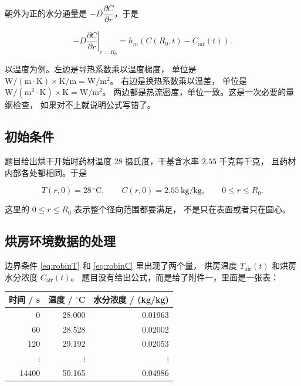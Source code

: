 朝外为正的水分通量是 $-D\dfrac{\partial C}{\partial r}$，于是

\begin{equation}
-D\left.\frac{\partial C}{\partial r}\right|_{r=R_0}
= h_m\left(C(R_0,t)-C_{\mathrm{air}}(t)\right).
\label{eq:robinC}
\end{equation}

以温度为例。左边是导热系数乘以温度梯度，
单位是 $\mathrm{W/(m\cdot K)}\times\mathrm{K/m}=\mathrm{W/m^2}$。
右边是换热系数乘以温差，
单位是 $\mathrm{W/(m^2\cdot K)}\times\mathrm{K}=\mathrm{W/m^2}$。
两边都是热流密度，单位一致。这是一次必要的量纲检查，
如果对不上就说明公式写错了。

\subsection{初始条件}

题目给出烘干开始时药材温度 $28$ 摄氏度，干基含水率 $2.55$ 千克每千克，
且药材内部各处都相同。于是

\begin{equation}
T(r,0)=28\,^\circ\mathrm{C},\qquad C(r,0)=2.55\ \mathrm{kg/kg},
\qquad 0\le r\le R_0 .
\label{eq:ic}
\end{equation}

这里的 $0\le r\le R_0$ 表示整个径向范围都要满足，
不是只在表面或者只在圆心。

\subsection{烘房环境数据的处理}

边界条件 \eqref{eq:robinT} 和 \eqref{eq:robinC} 里出现了两个量，
烘房温度 $T_{\mathrm{air}}(t)$ 和烘房水分浓度 $C_{\mathrm{air}}(t)$。
题目没有给出公式，而是给了附件一，里面是一张表：

\begin{center}
\begin{tabular}{@{}rrr@{}}
\toprule
时间 / s & 温度 / $^\circ$C & 水分浓度 / (kg/kg) \\
\midrule
0    & 28.000 & 0.01963 \\
60   & 28.528 & 0.02002 \\
120  & 29.192 & 0.02053 \\
$\vdots$ & $\vdots$ & $\vdots$ \\
14400 & 50.165 & 0.04986 \\
\bottomrule
\end{tabular}
\end{center}

